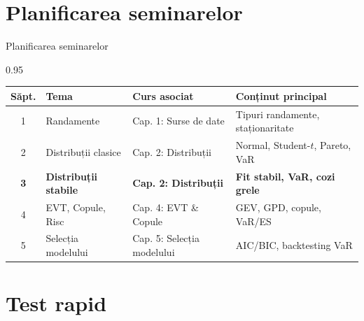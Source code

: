 \documentclass[9pt, aspectratio=169, t]{beamer}
\begin{document}
\section{Planificarea seminarelor}

\begin{frame}{Planificarea seminarelor}
    \begin{cminipage}{0.95\textwidth}
\renewcommand{\arraystretch}{1.3}
\begin{center}
\begin{tabular}{clll}
\toprule
\textbf{Săpt.} & \textbf{Tema} & \textbf{Curs asociat} & \textbf{Conținut principal} \\
\midrule
1 & Randamente & Cap. 1: Surse de date & Tipuri randamente, staționaritate \\
2 & Distribuții clasice & Cap. 2: Distribuții & Normal, Student-$t$, Pareto, VaR \\
\rowcolor{MainBlue!10}
\textbf{3} & \textbf{Distribuții stabile} & \textbf{Cap. 2: Distribuții} & \textbf{Fit stabil, VaR, cozi grele} \\
4 & EVT, Copule, Risc & Cap. 4: EVT \& Copule & GEV, GPD, copule, VaR/ES \\
5 & Selecția modelului & Cap. 5: Selecția modelului & AIC/BIC, backtesting VaR \\
\bottomrule
\end{tabular}
\end{center}
    \end{cminipage}
\end{frame}

\section{Test rapid}
\end{document}
